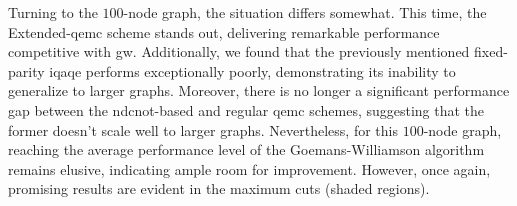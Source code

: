 

Turning to the $100$-node graph, the situation differs somewhat. This time, the Extended-\acrshort{qemc} scheme stands out, delivering remarkable performance competitive with \acrshort{gw}. Additionally, we found that the previously mentioned fixed-parity \acrshort{iqaqe} performs exceptionally poorly, demonstrating its inability to generalize to larger graphs. Moreover, there is no longer a significant performance gap between the \acrshort{ndcnot}-based and regular \acrshort{qemc} schemes, suggesting that the former doesn't scale well to larger graphs. Nevertheless, for this $100$-node graph, reaching the average performance level of the Goemans-Williamson algorithm remains elusive, indicating ample room for improvement. However, once again, promising results are evident in the maximum cuts (shaded regions).


\clearpage %



